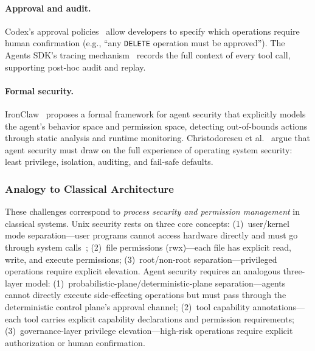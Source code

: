 \documentclass[11pt,a4paper]{article}
\begin{document}
\paragraph{Approval and audit.}
Codex's approval policies~\cite{openai_codex_approvals_2026} allow developers to specify which operations require human confirmation (e.g., ``any \texttt{DELETE} operation must be approved'').
The Agents SDK's tracing mechanism~\cite{openai_codex_agentsdk_2026} records the full context of every tool call, supporting post-hoc audit and replay.

\paragraph{Formal security.}
IronClaw~\cite{ironclaw2025} proposes a formal framework for agent security that explicitly models the agent's behavior space and permission space, detecting out-of-bounds actions through static analysis and runtime monitoring.
Christodorescu et al.~\cite{agenticsecurity2025} argue that agent security must draw on the full experience of operating system security: least privilege, isolation, auditing, and fail-safe defaults.

\subsubsection{Analogy to Classical Architecture}
These challenges correspond to \emph{process security and permission management} in classical systems.
Unix security rests on three core concepts: (1)~user/kernel mode separation---user programs cannot access hardware directly and must go through system calls~\cite{ostep_2023}; (2)~file permissions (rwx)---each file has explicit read, write, and execute permissions; (3)~root/non-root separation---privileged operations require explicit elevation.
Agent security requires an analogous three-layer model: (1)~probabilistic-plane/deterministic-plane separation---agents cannot directly execute side-effecting operations but must pass through the deterministic control plane's approval channel; (2)~tool capability annotations---each tool carries explicit capability declarations and permission requirements; (3)~governance-layer privilege elevation---high-risk operations require explicit authorization or human confirmation.
\end{document}
